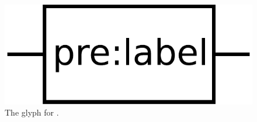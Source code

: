 \begin{figure}[H]
  \centering
  \includegraphics[scale = 0.3]{images/unitInformation}
  \caption{The \PD glyph for .}
  \label{fig:unitInfo}
\end{figure}






